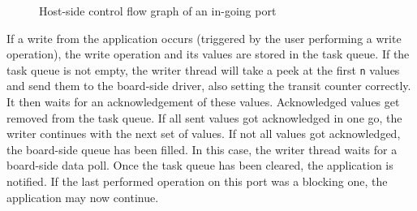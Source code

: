 \documentclass{report}
\begin{document}
\begin{figure}[h]
\centering
{}
\label{fig:cfg:hostIn}
\caption{Host-side control flow graph of an in-going port}
\end{figure}


If a write from the application occurs (triggered by the user performing a write operation), the write operation and its values are stored in the task queue. If the task queue is not empty, the writer thread will take a peek at the first \texttt{n} values and send them to the board-side driver, also setting the transit counter correctly. It then waits for an acknowledgement of these values. Acknowledged values get removed from the task queue. If all sent values got acknowledged in one go, the writer continues with the next set of values. If not all values got acknowledged, the board-side queue has been filled. In this case, the writer thread waits for a board-side data poll. Once the task queue has been cleared, the application is notified. If the last performed operation on this port was a blocking one, the application may now continue.
\end{document}
